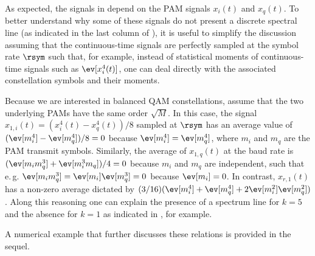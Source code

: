 As expected, the signals in  depend on the PAM signals $x_i(t)$ and $x_q(t)$.
To better understand why some of these signals do not present a discrete spectral line (as indicated
in the last column of ), it is useful to simplify the discussion assuming that the continuous-time
signals are perfectly sampled at the symbol rate $\rsym$ such that, for example,
instead of statistical moments of continuous-time signals such as $\ev[x_i^4(t)]$, one can deal directly with the associated constellation symbols and their moments.

Because we are interested in balanced QAM constellations, assume that the two underlying PAMs
have the same order $\sqrt{M}$. In this case, the signal 
$x_{1,i}(t)=(x_i^4(t)-x_q^4(t))/8$ sampled at $\rsym$ has an average value of
$(\ev[m_i^4]-\ev[m_q^4])/8=0$ because $\ev[m_i^4]=\ev[m_q^4]$, where $m_i$ and $m_q$ are the PAM transmit symbols.
Similarly, the average of $x_{1,q}(t)$ at the baud rate is
$(\ev[m_i m_q^3]+\ev[m_i^3 m_q])/4=0$ because $m_i$ and $m_q$ are independent, such that
e.\,g. $\ev[m_i m_q^3] = \ev[m_i] \ev[m_q^3] = 0$ because $\ev[m_i]=0$.
In contrast, $x_{r,1}(t)$ has a non-zero average dictated by
$(3/16)(\ev[m_i^4]+\ev[m_q^4] +2\ev[m_i^2] \ev[m_q^2])$.
Along this reasoning one can explain the presence of a spectrum line for $k=5$ and
the absence for $k=1$ as indicated in , for example.


A numerical example that further discusses these relations is provided in the sequel.
%



%

